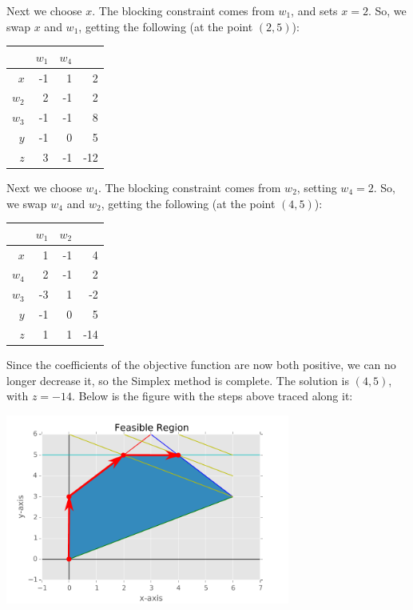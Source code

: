 \documentclass[fleqn]{homework}
\begin{document}
\begin{problem}{5}
    Next we choose $x$.  The blocking constraint comes from $w_1$, and sets
    $x=2$.  So, we swap $x$ and $w_1$, getting the following (at the point
    $(2, 5)$):

    \begin{tabular}{r|rrr}
      & $w_1$ & $w_4$ & \\
      \hline
      $x$   & -1 &  1 &  2 \\
      $w_2$ &  2 & -1 &  2 \\
      $w_3$ & -1 & -1 &  8 \\
      $y$   & -1 &  0 &  5 \\
      $z$   &  3 &  -1 & -12 \\
    \end{tabular}

    Next we choose $w_4$.  The blocking constraint comes from $w_2$, setting
    $w_4 = 2$.  So, we swap $w_4$ and $w_2$, getting the following (at the point
    $(4, 5)$):

    \begin{tabular}{r|rrr}
      & $w_1$ & $w_2$ & \\
      \hline
      $x$   &  1 & -1 &  4 \\
      $w_4$ &  2 & -1 &  2 \\
      $w_3$ & -3 &  1 & -2 \\
      $y$   & -1 &  0 &  5 \\
      $z$   &  1 &  1 & -14 \\
    \end{tabular}

    Since the coefficients of the objective function are now both positive, we
    can no longer decrease it, so the Simplex method is complete.  The solution
    is $(4, 5)$, with $z=-14$.  Below is the figure with the steps above traced
    along it:

    \begin{center}
      \includegraphics[width=0.7\textwidth]{pathc.pdf}
    \end{center}
  \end{problem}
\end{document}
